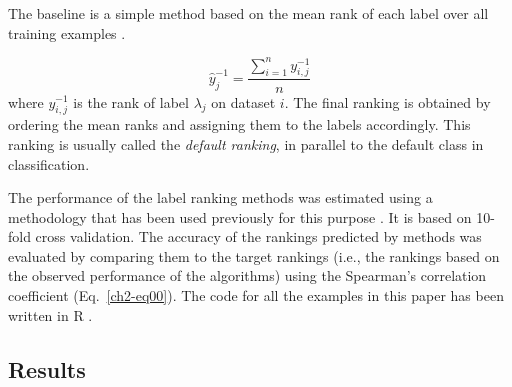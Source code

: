 The baseline is  a  simple method based on the mean rank of each label over all training examples \citep{brazdil2009}.

\begin{equation}
\label{ch2-default.rank}
\hat{y}^{-1}_{j} = \frac{\sum_{i=1}^n y^{-1}_{i,j}}{n}
\end{equation}
where $y^{-1}_{i,j}$ is the rank of label $\lambda_j$ on dataset $i$. The final ranking is obtained by ordering the mean ranks and assigning them to the labels accordingly. This ranking is usually called the \emph{default ranking}, in parallel to the default class in classification.



The performance of the label ranking methods was estimated using a methodology that has been used previously for this purpose \citep{brazdil2003}. It is based on 10-fold cross validation. The accuracy of the rankings predicted by methods was evaluated by comparing them to the target rankings (i.e., the rankings based on the observed performance of the algorithms) using the Spearman's correlation coefficient (Eq.~\ref{ch2-eq00}). The code for all the examples in this paper has been written in R \citep{rdl08}.

\subsection{Results}

